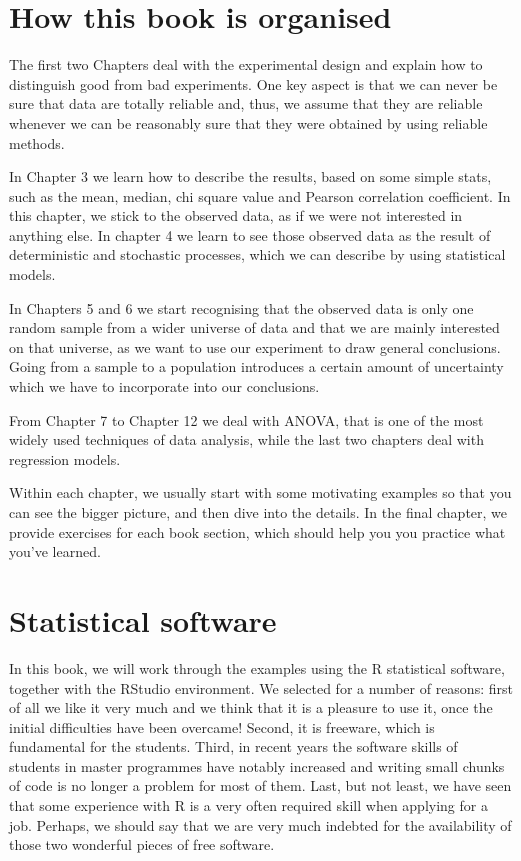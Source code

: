 \documentclass[a4paper,12pt,oneside]{book}
\begin{document}
\hypertarget{how-this-book-is-organised}{%
\section*{How this book is organised}\label{how-this-book-is-organised}}

The first two Chapters deal with the experimental design and explain how to distinguish good from bad experiments. One key aspect is that we can never be sure that data are totally reliable and, thus, we assume that they are reliable whenever we can be reasonably sure that they were obtained by using reliable methods.

In Chapter 3 we learn how to describe the results, based on some simple stats, such as the mean, median, chi square value and Pearson correlation coefficient. In this chapter, we stick to the observed data, as if we were not interested in anything else. In chapter 4 we learn to see those observed data as the result of deterministic and stochastic processes, which we can describe by using statistical models.

In Chapters 5 and 6 we start recognising that the observed data is only one random sample from a wider universe of data and that we are mainly interested on that universe, as we want to use our experiment to draw general conclusions. Going from a sample to a population introduces a certain amount of uncertainty which we have to incorporate into our conclusions.

From Chapter 7 to Chapter 12 we deal with ANOVA, that is one of the most widely used techniques of data analysis, while the last two chapters deal with regression models.

Within each chapter, we usually start with some motivating examples so that you can see the bigger picture, and then dive into the details. In the final chapter, we provide exercises for each book section, which should help you you practice what you've learned.

\hypertarget{statistical-software}{%
\section*{Statistical software}\label{statistical-software}}

In this book, we will work through the examples using the R statistical software, together with the RStudio environment. We selected for a number of reasons: first of all we like it very much and we think that it is a pleasure to use it, once the initial difficulties have been overcame! Second, it is freeware, which is fundamental for the students. Third, in recent years the software skills of students in master programmes have notably increased and writing small chunks of code is no longer a problem for most of them. Last, but not least, we have seen that some experience with R is a very often required skill when applying for a job. Perhaps, we should say that we are very much indebted for the availability of those two wonderful pieces of free software.
\end{document}
